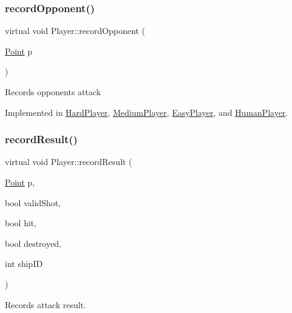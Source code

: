 \mbox{\label{class_player_a768e14edee61e208e6fd295cdd72a49c}} 
\subsubsection{\texorpdfstring{record\+Opponent()}{recordOpponent()}}
{\footnotesize\ttfamily virtual void Player\+::record\+Opponent (\begin{DoxyParamCaption}\item[{\mbox{\hyperlink{class_point}{Point}}}]{p }\end{DoxyParamCaption})\hspace{0.3cm}{\ttfamily [pure virtual]}}

Records opponent\textquotesingle{}s attack 

Implemented in \mbox{\hyperlink{class_hard_player_a986175fb966099ac5fe39950e18799ae}{Hard\+Player}}, \mbox{\hyperlink{class_medium_player_a6183d4a8fe3d68419afcfa9e33cd5928}{Medium\+Player}}, \mbox{\hyperlink{class_easy_player_a2121149ace67b4a67a5dfa7633738ea3}{Easy\+Player}}, and \mbox{\hyperlink{class_human_player_a16b18f42e02d7c8d1f0971ce5e91595f}{Human\+Player}}.

\mbox{\label{class_player_a368527cfefaac58dc942b32658f977ed}} 
\subsubsection{\texorpdfstring{record\+Result()}{recordResult()}}
{\footnotesize\ttfamily virtual void Player\+::record\+Result (\begin{DoxyParamCaption}\item[{\mbox{\hyperlink{class_point}{Point}}}]{p,  }\item[{bool}]{valid\+Shot,  }\item[{bool}]{hit,  }\item[{bool}]{destroyed,  }\item[{int}]{ship\+ID }\end{DoxyParamCaption})\hspace{0.3cm}{\ttfamily [pure virtual]}}



Records attack result. 



